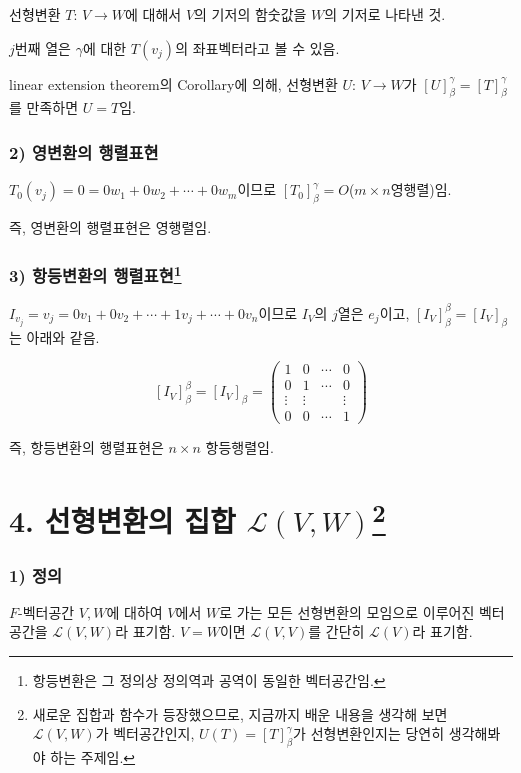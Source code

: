선형변환 $T:\,V \rightarrow W$에 대해서 $V$의 기저의 함숫값을 $W$의 기저로 나타낸 것.

$j$번째 열은 $\gamma$에 대한 $T(v_j)$의 좌표벡터라고 볼 수 있음.

linear extension theorem의 Corollary에 의해, 선형변환 $U:\,V \rightarrow W$가 $[U]_{\beta}^{\gamma}=[T]_{\beta}^{\gamma}$를 만족하면 $U=T$임.


\subsubsection*{2) 영변환의 행렬표현}
$T_{0}(v_j)=0=0w_1+0w_2+ \cdots +0w_m$이므로 $[T_{0}]_{\beta}^{\gamma}=O$($m \times n$영행렬)임.

즉, 영변환의 행렬표현은 영행렬임.

\subsubsection*{3) 항등변환의 행렬표현\footnote{항등변환은 그 정의상 정의역과 공역이 동일한 벡터공간임.}}
$I_{v_j}=v_j=0v_1+0v_2+ \cdots +1v_j+ \cdots +0v_n$이므로 $I_V$의 $j$열은 $e_j$이고, $[I_{V}]_{\beta}^{\beta}=[I_{V}]_{\beta}$는 아래와 같음.

\[
[I_{V}]_{\beta}^{\beta}=[I_{V}]_{\beta}=
\begin{pmatrix}
1 & 0 & \cdots & 0\\
0 & 1 & \cdots & 0\\
\vdots & \vdots & & \vdots\\
0 & 0 & \cdots & 1
\end{pmatrix}
\]

즉, 항등변환의 행렬표현은 $n \times n$ 항등행렬임.\\


\newpage


\section*{4. 선형변환의 집합 $\mathcal{L}(V,W)$\footnote{새로운 집합과 함수가 등장했으므로, 지금까지 배운 내용을 생각해 보면 $\mathcal{L}(V,W)$가 벡터공간인지, $U(T)=[T]_{\beta}^{\gamma}$가 선형변환인지는 당연히 생각해봐야 하는 주제임.}}

\subsubsection*{1) 정의\\}
\begin{DEF}
$F$-벡터공간 $V,W$에 대하여 $V$에서 $W$로 가는 모든 선형변환의 모임으로 이루어진 벡터공간을 $\mathcal{L}(V,W)$라 표기함. $V=W$이면 $\mathcal{L}(V,V)$를 간단히 $\mathcal{L}(V)$라 표기함.
\end{DEF}

